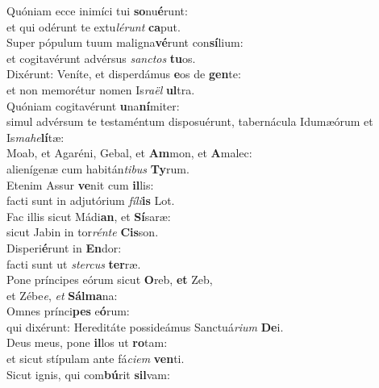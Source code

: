 \evenverse Quóniam ecce inimíci tui \textbf{so}nu\textbf{é}runt:~\*\\
\evenverse et qui odérunt te extu\textit{lé}\textit{runt} \textbf{ca}put.\\
\oddverse Super pópulum tuum maligna\textbf{vé}runt con\textbf{sí}lium:~\*\\
\oddverse et cogitavérunt advérsus \textit{san}\textit{ctos} \textbf{tu}os.\\
\evenverse Dixérunt: Veníte, et disperdámus \textbf{e}os de \textbf{gen}te:~\*\\
\evenverse et non memorétur nomen Is\textit{ra}\textit{ël} \textbf{ul}tra.\\
\oddverse Quóniam cogitavérunt \textbf{u}na\textbf{ní}miter:~\*\\
\oddverse simul advérsum te testaméntum disposuérunt, tabernácula Idumæórum et Is\textit{ma}\textit{he}\textbf{lí}tæ:\\
\evenverse Moab, et Agaréni, Gebal, et \textbf{Am}mon, et \textbf{A}malec:~\*\\
\evenverse alienígenæ cum habitán\textit{ti}\textit{bus} \textbf{Ty}rum.\\
\oddverse Etenim Assur \textbf{ve}nit cum \textbf{il}lis:~\*\\
\oddverse facti sunt in adjutórium \textit{fí}\textit{li}\textbf{is} Lot.\\
\evenverse Fac illis sicut Mádi\textbf{an}, et \textbf{Sí}saræ:~\*\\
\evenverse sicut Jabin in tor\textit{rén}\textit{te} \textbf{Cis}son.\\
\oddverse Disperi\textbf{é}runt in \textbf{En}dor:~\*\\
\oddverse facti sunt ut \textit{ster}\textit{cus} \textbf{ter}ræ.\\
\evenverse Pone príncipes eórum sicut \textbf{O}reb, \textbf{et} Zeb,~\*\\
\evenverse et Zébe\textit{e}, \textit{et} \textbf{Sál}\textbf{ma}na:\\
\oddverse Omnes prínci\textbf{pes} e\textbf{ó}rum:~\*\\
\oddverse qui dixérunt: Hereditáte possideámus Sanctuá\textit{ri}\textit{um} \textbf{De}i.\\
\evenverse Deus meus, pone \textbf{il}los ut \textbf{ro}tam:~\*\\
\evenverse et sicut stípulam ante fá\textit{ci}\textit{em} \textbf{ven}ti.\\
\oddverse Sicut ignis, qui com\textbf{bú}rit \textbf{sil}vam:~\*\\
